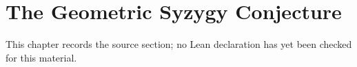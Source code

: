 \chapter{The Geometric Syzygy Conjecture}
\label{universal-secant-bundles-syzygies-canonical-curves-chapter-03}

\begin{remark}
\label{universal-secant-bundles-syzygies-canonical-curves-chapter-03-source}
This chapter records the source section; no Lean declaration has yet been checked for this material.
\notready
\end{remark}

